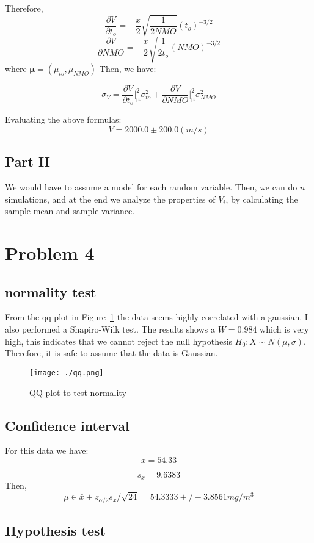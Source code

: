 \documentclass[10pt]{article}
\def\der#1#2#3{
\frac{\partial #1}{\partial #2}\bigg|_{#3}
}
\def\ders#1#2{
\frac{\partial #1}{\partial #2}
}
\begin{document}
Therefore,
\[
\ders{V}{t_o} = -\frac{x}{2} \sqrt{\frac{1}{2NMO}} \left( t_o \right)^{-3/2}
\]
\[
\ders{V}{NMO} = -\frac{x}{2} \sqrt{\frac{1}{2t_o}} \left( NMO \right)^{-3/2}
\]
where $\mathbf{\mu}=(\mu_{to},\mu_{NMO})$
Then, we have:

\[
\sigma_V  = \der{V}{t_o}{\mathbf{\mu}}^2 \sigma_{to}^2 +\der{V}{NMO}{\mathbf{\mu}}^2 \sigma_{NMO}^2
\]

Evaluating the above formulas:
\[
V = 2000.0 \pm 200.0 (m/s)
\]

\subsection{Part II}
We would have to assume a model for each random variable. Then, we can do $n$ simulations, 
and at the end we analyze the properties of $V_i$, by calculating the sample mean and sample
variance.

\section{Problem 4}

\subsection{normality test} 

From the qq-plot in Figure~\ref{fig:qq} the data seems highly correlated with a gaussian. 
I also performed a Shapiro-Wilk test. The results
shows a $W=0.984$ which is very high, this indicates that we cannot reject the null hypothesis
$H_0 : X\sim N(\mu,\sigma)$. Therefore, it is safe to assume that the data is Gaussian.


\begin{figure}[H]
    \centering
    \texttt{[image: ./qq.png]}
    \caption{QQ plot to test normality}
    \label{fig:qq}
\end{figure}

\subsection{Confidence interval}
For this data we have:
\[
  \bar{x} = 54.33 
\]

\[
  s_x = 9.6383
\]
Then,
\[
\mu \in \bar{x} \pm z_{\alpha/2} s_x/\sqrt{24} = 54.3333 +/- 3.8561 mg/m^3
\]
\subsection{Hypothesis test}
\end{document}
